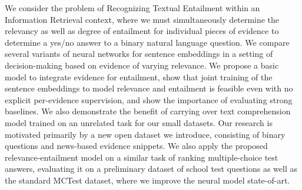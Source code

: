 We consider the problem of Recognizing Textual Entailment within an Information Retrieval context, where we must simultaneously determine the relevancy as well as degree of entailment for individual pieces of evidence to determine a yes/no answer to a binary natural language question. We compare several variants of neural networks for sentence embeddings in a setting of decision-making based on evidence of varying relevance.  We propose a basic model to integrate evidence for entailment, show that joint training of the sentence embeddings to model relevance and entailment is feasible even with no explicit per-evidence supervision, and show the importance of evaluating strong baselines.  We also demonstrate the benefit of carrying over text comprehension model trained on an unrelated task for our small datasets. Our research is motivated primarily by a new open dataset we introduce, consisting of binary questions and news-based evidence snippets.  We also apply the proposed relevance-entailment model on a similar task of ranking multiple-choice test answers, evaluating it on a preliminary dataset of school test questions as well as the standard MCTest dataset, where we improve the neural model state-of-art.
